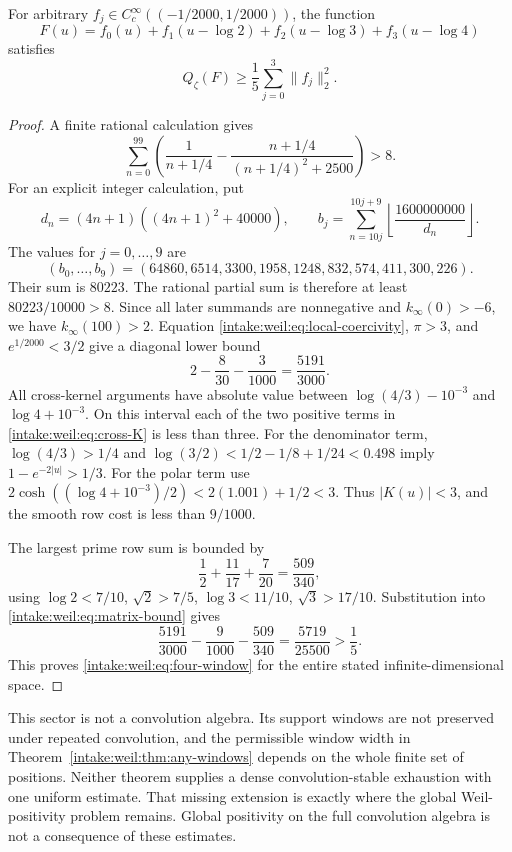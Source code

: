 \begin{theorem}\label{intake:weil:thm:four-windows}
For arbitrary $f_j\in C_c^\infty((-1/2000,1/2000))$, the function
\[
 F(u)=f_0(u)+f_1(u-\log2)+f_2(u-\log3)+f_3(u-\log4)
\]
satisfies
\begin{equation}\label{intake:weil:eq:four-window}
 \boxed{\displaystyle Q_\zeta(F)\ge\frac15\sum_{j=0}^3\|f_j\|_2^2.}
\end{equation}
\end{theorem}
\begin{proof}
A finite rational calculation gives
\[
 \sum_{n=0}^{99}\left(\frac1{n+1/4}
 -\frac{n+1/4}{(n+1/4)^2+2500}\right)>8.
\]
For an explicit integer calculation, put
\[
 d_n=(4n+1)((4n+1)^2+40000),\qquad
 b_j=\sum_{n=10j}^{10j+9}\left\lfloor\frac{1600000000}{d_n}\right\rfloor.
\]
The values for $j=0,\ldots,9$ are
\[
 (b_0,\ldots,b_9)=(64860,6514,3300,1958,1248,832,574,411,300,226).
\]
Their sum is $80223$. The rational partial sum is therefore at least
$80223/10000>8$. Since all later summands are nonnegative and $k_\infty(0)>-6$, we have $k_\infty(100)>2$. Equation \eqref{intake:weil:eq:local-coercivity}, $\pi>3$, and $e^{1/2000}<3/2$ give a diagonal lower bound
\[
 2-\frac8{30}-\frac3{1000}=\frac{5191}{3000}.
\]
All cross-kernel arguments have absolute value between $\log(4/3)-10^{-3}$ and $\log4+10^{-3}$. On this interval each of the two positive terms in \eqref{intake:weil:eq:cross-K} is less than three. For the denominator term, $\log(4/3)>1/4$ and $\log(3/2)<1/2-1/8+1/24<0.498$ imply $1-e^{-2|u|}>1/3$. For the polar term use $2\cosh((\log4+10^{-3})/2)<2(1.001)+1/2<3$. Thus $|K(u)|<3$, and the smooth row cost is less than $9/1000$.

The largest prime row sum is bounded by
\[
 \frac12+\frac{11}{17}+\frac7{20}=\frac{509}{340},
\]
using $\log2<7/10$, $\sqrt2>7/5$, $\log3<11/10$, $\sqrt3>17/10$. Substitution into \eqref{intake:weil:eq:matrix-bound} gives
\[
 \frac{5191}{3000}-\frac9{1000}-\frac{509}{340}=\frac{5719}{25500}>\frac15.
\]
This proves \eqref{intake:weil:eq:four-window} for the entire stated infinite-dimensional space.
\end{proof}

This sector is not a convolution algebra. Its support windows are not preserved under repeated convolution, and the permissible window width in Theorem~\ref{intake:weil:thm:any-windows} depends on the whole finite set of positions. Neither theorem supplies a dense convolution-stable exhaustion with one uniform estimate. That missing extension is exactly where the global Weil-positivity problem remains. Global positivity on the full convolution algebra is not a consequence of these estimates.


